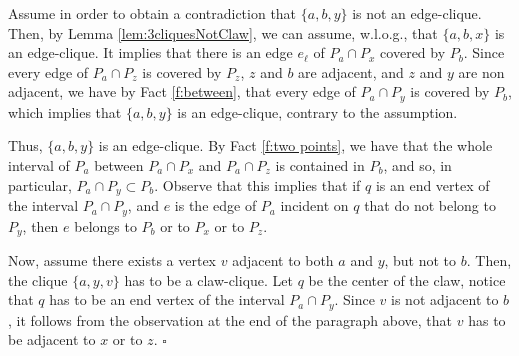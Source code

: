 \documentclass[9pt]{entcs}
\begin{document}
\begin{pf}
Assume in order to obtain a contradiction that $\{a,b,y\}$ is not an edge-clique. Then, by Lemma
\ref{lem:3cliquesNotClaw}, we can assume, w.l.o.g., that $\{a,b,x\}$ is an edge-clique.
It implies that there is an edge $e_{\ell}$ of $P_a \cap P_x$ covered by $P_b$. Since every  edge
of $P_a\cap P_z$ is covered  by $P_z$, $z$ and $b$ are adjacent, and $z$ and $y$ are non adjacent, we have by Fact \ref{f:between},
that every edge of $P_a\cap P_y$ is covered by $P_b$, which implies  that $\{a,b,y\}$ is an edge-clique, contrary to the assumption.

Thus, $\{a,b,y\}$ is an edge-clique. By Fact \ref{f:two points}, we have that the whole interval of $P_a$ between 
 $P_a \cap P_x$ and   $P_a \cap P_z$ is contained in $P_b$, and so, in particular, $P_a\cap P_y \subset P_b$. Observe that this
 implies that if $q$ is an end vertex of the interval $P_a \cap P_y$, and $e$ is the edge of $P_a$ incident on $q$ that do not belong to $P_y$, then 
$e$ belongs to $P_b$ or to $P_x$ or to $P_z$.
 
 Now, assume there exists a vertex $v$ adjacent to both $a$ and $y$, but not to $b$. Then, the clique $\{a,y,v\}$ has to be a claw-clique. Let $q$ be the center of the claw, notice that $q$ has to be an end vertex of the interval $P_a \cap P_y$.
 Since $v$ is not adjacent to $b$, it follows from the observation at the end of the paragraph above, that
 $v$ has to be adjacent to $x$ or to $z$.
$\square$


\end{pf}
\end{document}
